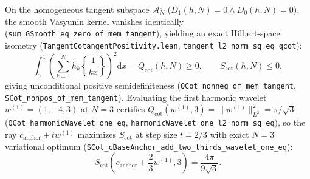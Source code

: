 \documentclass[11pt,a4paper]{article}
\theoremstyle{definition}
\newcommand{\dee}{\mathrm{d}}
\begin{document}
On the homogeneous tangent subspace $\mathcal{A}_N^0$ ($D_1(h, N) = 0 \land D_0(h, N) = 0$), the smooth Vasyunin kernel vanishes identically (\texttt{sum\_\allowbreak GSmooth\_\allowbreak eq\_\allowbreak zero\_\allowbreak of\_\allowbreak mem\_\allowbreak tangent}), yielding an exact Hilbert-space isometry (\texttt{Tangent\allowbreak Cotangent\allowbreak Positivity.lean}, \texttt{tangent\_\allowbreak l2\_\allowbreak norm\_\allowbreak sq\_\allowbreak eq\_\allowbreak qcot}):
\begin{equation}
\int_0^1 \!\left(\sum_{k=1}^N h_k \left\{\frac{1}{kx}\right\}\right)^{\!2}\!\dee x
= Q_{\mathrm{cot}}(h, N) \ge 0,
\qquad S_{\mathrm{cot}}(h, N) \le 0,
\end{equation}
giving unconditional positive semidefiniteness (\texttt{QCot\_\allowbreak nonneg\_\allowbreak of\_\allowbreak mem\_\allowbreak tangent}, \texttt{SCot\_\allowbreak nonpos\_\allowbreak of\_\allowbreak mem\_\allowbreak tangent}). Evaluating the first harmonic wavelet $w^{(1)} = (1, -4, 3)$ at $N = 3$ certifies $Q_{\mathrm{cot}}(w^{(1)}, 3) = \|w^{(1)}\|_{L^2}^2 = \pi/\sqrt{3}$ (\texttt{QCot\_\allowbreak harmonic\allowbreak Wavelet\_\allowbreak one\_\allowbreak eq}, \texttt{harmonic\allowbreak Wavelet\_\allowbreak one\_\allowbreak l2\_\allowbreak norm\_\allowbreak sq\_\allowbreak eq}), so the ray $c_{\mathrm{anchor}} + t w^{(1)}$ maximizes $S_{\mathrm{cot}}$ at step size $t = 2/3$ with exact $N = 3$ variational optimum (\texttt{SCot\_\allowbreak cBaseAnchor\_\allowbreak add\_\allowbreak two\_\allowbreak thirds\_\allowbreak wavelet\_\allowbreak one\_\allowbreak eq}):
\begin{equation}
S_{\mathrm{cot}}\!\left(c_{\mathrm{anchor}} + \frac{2}{3} w^{(1)}, 3\right) = \frac{4\pi}{9\sqrt{3}}.
\end{equation}
\end{document}
